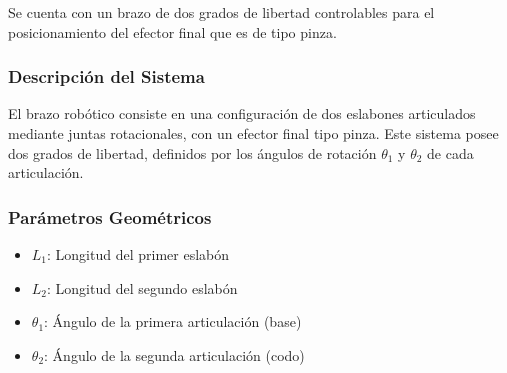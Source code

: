 Se cuenta con un brazo de dos grados de libertad controlables para el posicionamiento del efector final que es de tipo pinza.

\subsubsection{Descripción del Sistema}

El brazo robótico consiste en una configuración de dos eslabones articulados mediante juntas rotacionales, con un efector final tipo pinza. Este sistema posee dos grados de libertad, definidos por los ángulos de rotación $\theta_1$ y $\theta_2$ de cada articulación.

\subsubsection{Parámetros Geométricos}

\begin{itemize}
    \item $L_1$: Longitud del primer eslabón
    \item $L_2$: Longitud del segundo eslabón
    \item $\theta_1$: Ángulo de la primera articulación (base)
    \item $\theta_2$: Ángulo de la segunda articulación (codo)
\end{itemize}








